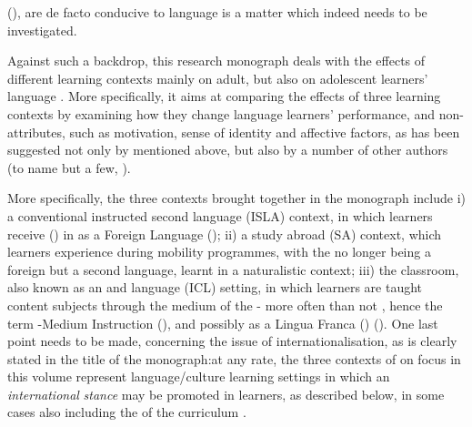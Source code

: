 \documentclass[output=paper]{langsci/langscibook}
\begin{document}
(\citealt{Pérez-VidalLorenzoTrenchs2017}), are de facto conducive to language  is a matter which indeed needs to be investigated. 

Against such a backdrop, this research monograph deals with the effects of different learning contexts mainly on adult, but also on adolescent learners’ language . More specifically, it aims at comparing the effects of three learning contexts by examining how they change language learners’  performance, and non- attributes, such as motivation, sense of identity and affective factors, as has been suggested not only by \citet{Collentine2004effects} mentioned above, but also by a number of other authors (to name but a few, \citealt{Pellegrino2005,Dewaele2007,Hernández2010,LasagabasterEtAl2014,TaguchiEtAl2016}). 

\newpage 
More specifically, the three contexts brought together in the monograph include i) a conventional instructed second language  (ISLA) context, in which learners receive  () in  as a Foreign Language (); ii) a study abroad (SA) context, which learners experience during mobility programmes, with the  no longer being a foreign but a second language, learnt in a naturalistic context; iii) the  classroom, also known as an  and language (ICL) setting, in which learners are taught content subjects through the medium of the  - more often than not , hence the term  -Medium Instruction (), and possibly  as a Lingua Franca () (\citealt{Björkman2013,House2013}). One last point needs to be made, concerning the issue of internationalisation, as is clearly stated in the title of the monograph:at any rate, the three contexts of  on focus in this volume represent language/culture learning settings in which an \textit{international} \textit{stance} may be promoted in learners, as described below, in some cases also including the  of the curriculum \citep{Leask2015}. 
\end{document}

